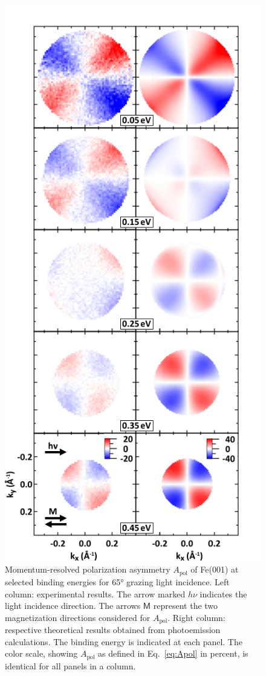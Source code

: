 \documentclass[prl,twocolumn,floatfix,superscriptaddress,aps]{revtex4-2}
\begin{document}
\begin{figure}
    \centering
    \includegraphics[width = 0.7\columnwidth]{FePaperApol.pdf}
    \caption{Momentum-resolved polarization asymmetry $A_{\mathrm{pol}}$ of Fe(001) at selected binding energies for 65° grazing light incidence. Left column: experimental results. The arrow marked $h \nu$ indicates the light incidence direction. The arrows $\textsf{M}$ represent the two magnetization directions considered for $A_{\mathrm{pol}}$. Right column: respective theoretical results obtained from photoemission calculations. The binding energy is indicated at each panel. The color scale, showing $A_{\mathrm{pol}}$ as defined in Eq.~\eqref{eq:Apol} in percent, is identical for all panels in a column. 
    }
    \label{fig:Apol}
\end{figure}
\end{document}
